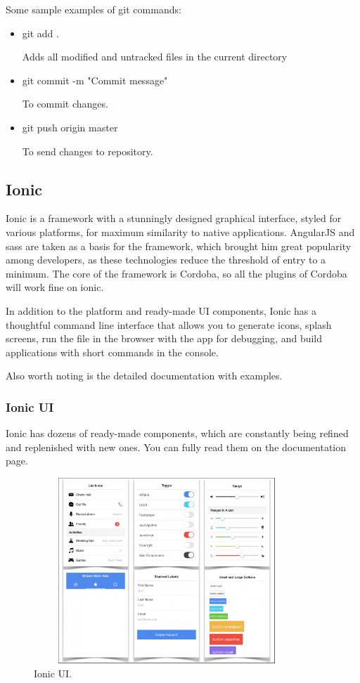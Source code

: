 Some sample examples of git commands:
\begin{itemize}

    \item git add .\par
    Adds all modified and untracked files in the current directory
    
    \item git commit -m "Commit message"\par
    To commit changes.
    
    \item git push origin master\par
    To send changes to repository. 
\end{itemize}

\subsection{Ionic}
Ionic is a framework with a stunningly designed graphical interface, styled for various platforms, for maximum similarity to native applications. AngularJS and sass are taken as a basis for the framework, which brought him great popularity among developers, as these technologies reduce the threshold of entry to a minimum. The core of the framework is Cordoba, so all the plugins of Cordoba will work fine on ionic.\par In addition to the platform and ready-made UI components, Ionic has a thoughtful command line interface that allows you to generate icons, splash screens, run the file in the browser with the app for debugging, and build applications with short commands in the console.\par Also worth noting is the detailed documentation with examples.\cite{Ionic}

\subsubsection{Ionic UI}
Ionic has dozens of ready-made components, which are constantly being refined and replenished with new ones. You can fully read them on the documentation page.\cite{IonicUI}

\begin{figure}[h]
\centering
\includegraphics[width=10cm, height=7cm]{img/IonicUI.png}
\caption{Ionic UI.}
\end{figure}

